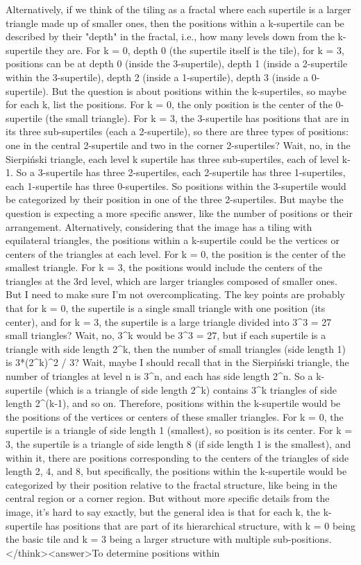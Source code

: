 Alternatively, if we think of the tiling as a fractal where each supertile is a larger triangle made up of smaller ones, then the positions within a k-supertile can be described by their "depth" in the fractal, i.e., how many levels down from the k-supertile they are. For k = 0, depth 0 (the supertile itself is the tile), for k = 3, positions can be at depth 0 (inside the 3-supertile), depth 1 (inside a 2-supertile within the 3-supertile), depth 2 (inside a 1-supertile), depth 3 (inside a 0-supertile). But the question is about positions within the k-supertiles, so maybe for each k, list the positions. For k = 0, the only position is the center of the 0-supertile (the small triangle). For k = 3, the 3-supertile has positions that are in its three sub-supertiles (each a 2-supertile), so there are three types of positions: one in the central 2-supertile and two in the corner 2-supertiles? Wait, no, in the Sierpiński triangle, each level k supertile has three sub-supertiles, each of level k-1. So a 3-supertile has three 2-supertiles, each 2-supertile has three 1-supertiles, each 1-supertile has three 0-supertiles. So positions within the 3-supertile would be categorized by their position in one of the three 2-supertiles. But maybe the question is expecting a more specific answer, like the number of positions or their arrangement. Alternatively, considering that the image has a tiling with equilateral triangles, the positions within a k-supertile could be the vertices or centers of the triangles at each level. For k = 0, the position is the center of the smallest triangle. For k = 3, the positions would include the centers of the triangles at the 3rd level, which are larger triangles composed of smaller ones. But I need to make sure I'm not overcomplicating. The key points are probably that for k = 0, the supertile is a single small triangle with one position (its center), and for k = 3, the supertile is a large triangle divided into 3^3 = 27 small triangles? Wait, no, 3^k would be 3^3 = 27, but if each supertile is a triangle with side length 2^k, then the number of small triangles (side length 1) is 3*(2^k)^2 / 3? Wait, maybe I should recall that in the Sierpiński triangle, the number of triangles at level n is 3^n, and each has side length 2^n. So a k-supertile (which is a triangle of side length 2^k) contains 3^k triangles of side length 2^(k-1), and so on. Therefore, positions within the k-supertile would be the positions of the vertices or centers of these smaller triangles. For k = 0, the supertile is a triangle of side length 1 (smallest), so position is its center. For k = 3, the supertile is a triangle of side length 8 (if side length 1 is the smallest), and within it, there are positions corresponding to the centers of the triangles of side length 2, 4, and 8, but specifically, the positions within the k-supertile would be categorized by their position relative to the fractal structure, like being in the central region or a corner region. But without more specific details from the image, it's hard to say exactly, but the general idea is that for each k, the k-supertile has positions that are part of its hierarchical structure, with k = 0 being the basic tile and k = 3 being a larger structure with multiple sub-positions.</think><answer>To determine positions within 